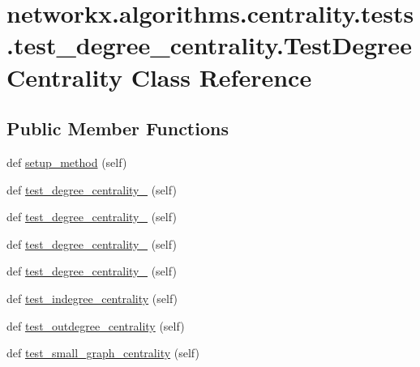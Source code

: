 \hypertarget{classnetworkx_1_1algorithms_1_1centrality_1_1tests_1_1test__degree__centrality_1_1TestDegreeCentrality}{}\section{networkx.\+algorithms.\+centrality.\+tests.\+test\+\_\+degree\+\_\+centrality.\+Test\+Degree\+Centrality Class Reference}
\label{classnetworkx_1_1algorithms_1_1centrality_1_1tests_1_1test__degree__centrality_1_1TestDegreeCentrality}
\subsection*{Public Member Functions}
\begin{DoxyCompactItemize}
\item 
def \hyperlink{classnetworkx_1_1algorithms_1_1centrality_1_1tests_1_1test__degree__centrality_1_1TestDegreeCentrality_aa9bcbbf29dd30e6c5e3864a1fbe7b67d}{setup\+\_\+method} (self)
\item 
def \hyperlink{classnetworkx_1_1algorithms_1_1centrality_1_1tests_1_1test__degree__centrality_1_1TestDegreeCentrality_ab5187f325ff4d6cf128786185111c6c9}{test\+\_\+degree\+\_\+centrality\+\_} (self)
\item 
def \hyperlink{classnetworkx_1_1algorithms_1_1centrality_1_1tests_1_1test__degree__centrality_1_1TestDegreeCentrality_a429ae45bc356e694159dcd905a4ec5b2}{test\+\_\+degree\+\_\+centrality\+\_} (self)
\item 
def \hyperlink{classnetworkx_1_1algorithms_1_1centrality_1_1tests_1_1test__degree__centrality_1_1TestDegreeCentrality_a2dc50cba14766f40e922d89dad9a0662}{test\+\_\+degree\+\_\+centrality\+\_} (self)
\item 
def \hyperlink{classnetworkx_1_1algorithms_1_1centrality_1_1tests_1_1test__degree__centrality_1_1TestDegreeCentrality_ab02d9fb0c215a80e01b701e313deb55a}{test\+\_\+degree\+\_\+centrality\+\_} (self)
\item 
def \hyperlink{classnetworkx_1_1algorithms_1_1centrality_1_1tests_1_1test__degree__centrality_1_1TestDegreeCentrality_a469b1705c762fbbf6c36bc7481c7bc42}{test\+\_\+indegree\+\_\+centrality} (self)
\item 
def \hyperlink{classnetworkx_1_1algorithms_1_1centrality_1_1tests_1_1test__degree__centrality_1_1TestDegreeCentrality_a61fb82993075c5436b9d64c20e91811a}{test\+\_\+outdegree\+\_\+centrality} (self)
\item 
def \hyperlink{classnetworkx_1_1algorithms_1_1centrality_1_1tests_1_1test__degree__centrality_1_1TestDegreeCentrality_a9d20602afcb457dce9ba7c174a26a4ad}{test\+\_\+small\+\_\+graph\+\_\+centrality} (self)
\end{DoxyCompactItemize}
